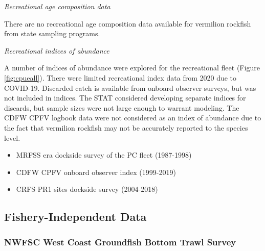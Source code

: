\documentclass[11pt,
  english,
  a4paper,
]{article}
\begin{document}
\emph{Recreational age composition data}

There are no recreational age composition data available for vermilion rockfish from state sampling programs.

\emph{Recreational indices of abundance}

A number of indices of abundance were explored for the recreational fleet (Figure \ref{fig:cpueall}). There were limited recreational index data from 2020 due to COVID-19. Discarded catch is available from onboard observer surveys, but was not included in indices. The STAT considered developing separate indices for discards, but sample sizes were not large enough to warrant modeling. The CDFW CPFV logbook data were not considered as an index of abundance due to the fact that vermilion rockfish may not be accurately reported to the species level.


\begin{itemize}
\item

  MRFSS era dockside survey of the PC fleet (1987-1998)

  \tagmcend\tagstructend\tagstructend
\item

  CDFW CPFV onboard observer index (1999-2019)

  \tagmcend\tagstructend\tagstructend
\item

  CRFS PR1 sites dockside survey (2004-2018)

  \tagmcend\tagstructend\tagstructend
\end{itemize}

\tagstructend


\hypertarget{fishery-independent-data}{%
\subsection{Fishery-Independent Data}\label{fishery-independent-data}}

\leavevmode\tagmcend\tagstructend


\hypertarget{nwfsc-west-coast-groundfish-bottom-trawl-survey}{%
\subsubsection{NWFSC West Coast Groundfish Bottom Trawl Survey}\label{nwfsc-west-coast-groundfish-bottom-trawl-survey}}
\end{document}
